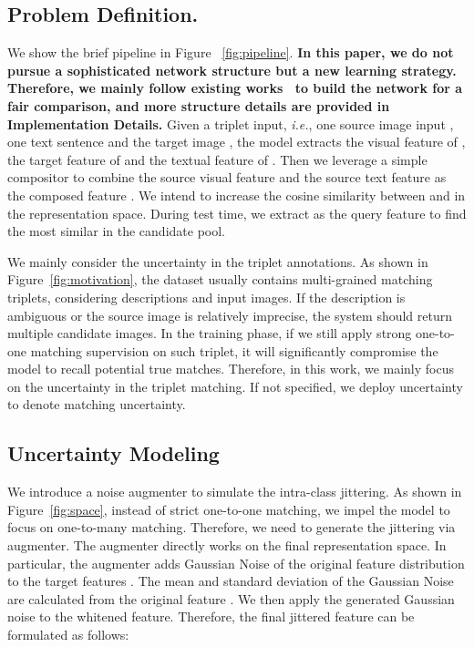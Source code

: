 \documentclass[10pt,twocolumn,letterpaper]{article}
\def\ie{\emph{i.e.}}
\begin{document}
\subsection{Problem Definition.} 
We show the brief pipeline in Figure ~\ref{fig:pipeline}. \textbf{In this paper, we do not pursue a sophisticated network structure but a new learning strategy. Therefore, we mainly follow existing works~\cite{2021CoSMo,Chen_2020_CVPR} to build the network for a fair comparison, and more structure details are provided in Implementation Details.} Given a triplet input, \ie, one source image input , one text sentence  and the target image , the model extracts the visual feature  of , the target feature  of  and the textual feature   of . Then we leverage a simple compositor to combine the source visual feature  and the source text feature  as the composed feature .
We intend to increase the cosine similarity between  and  in the representation space.
During test time, we extract  as the query feature to find the most similar  in the candidate pool.  

We mainly consider the uncertainty in the triplet annotations. As shown in Figure~\ref{fig:motivation}, the dataset usually contains multi-grained matching triplets, considering descriptions and input images. 
If the description is ambiguous or the source image is relatively imprecise, the system should return multiple candidate images. 
In the training phase, if we still apply strong one-to-one matching supervision on such triplet, it will significantly compromise the model to recall potential true matches. 
Therefore, in this work, we mainly focus on the uncertainty in the triplet matching. If not specified, we deploy uncertainty to denote matching uncertainty.

\subsection{Uncertainty Modeling} 
We introduce a noise augmenter to simulate the intra-class jittering. As shown in Figure~\ref{fig:space}, instead of strict one-to-one matching, we impel the model to focus on one-to-many matching. Therefore, we need to generate the jittering via augmenter.   
The augmenter directly works on the final representation space. 
In particular, the augmenter adds Gaussian Noise of the original feature distribution to the target features . 
The mean  and standard deviation  of the Gaussian Noise are calculated from the original feature . We then apply the generated Gaussian noise to the whitened feature. Therefore, the final jittered feature  can be formulated as follows:\vspace{-2mm}
\end{document}
